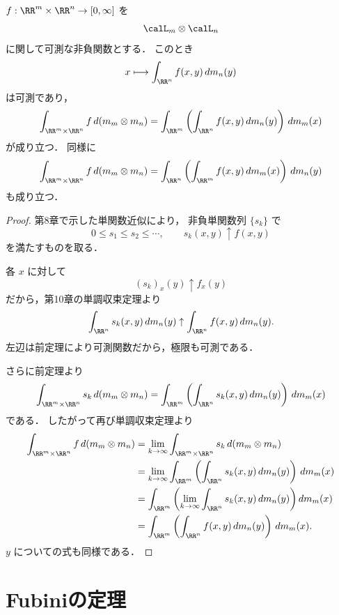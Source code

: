 \begin{theorem}[Tonelliの定理]
$f:\RR^m\times\RR^n\to[0,\infty]$ を
\[
\calL_m\otimes\calL_n
\]
に関して可測な非負関数とする．
このとき
\[
x\longmapsto \int_{\RR^n}f(x,y)\,dm_n(y)
\]
は可測であり，
\[
\int_{\RR^m\times\RR^n}f\,d(m_m\otimes m_n)
=
\int_{\RR^m}\left(\int_{\RR^n}f(x,y)\,dm_n(y)\right)\,dm_m(x)
\]
が成り立つ．
同様に
\[
\int_{\RR^m\times\RR^n}f\,d(m_m\otimes m_n)
=
\int_{\RR^n}\left(\int_{\RR^m}f(x,y)\,dm_m(x)\right)\,dm_n(y)
\]
も成り立つ．
\end{theorem}
\begin{proof}
第8章で示した単関数近似により，
非負単関数列 $\{s_k\}$ で
\[
0\le s_1\le s_2\le\cdots,\qquad s_k(x,y)\uparrow f(x,y)
\]
を満たすものを取る．

各 $x$ に対して
\[
(s_k)_x(y)\uparrow f_x(y)
\]
だから，第10章の単調収束定理より
\[
\int_{\RR^n}s_k(x,y)\,dm_n(y)
\uparrow
\int_{\RR^n}f(x,y)\,dm_n(y).
\]
左辺は前定理により可測関数だから，極限も可測である．

さらに前定理より
\[
\int_{\RR^m\times\RR^n}s_k\,d(m_m\otimes m_n)
=
\int_{\RR^m}\left(\int_{\RR^n}s_k(x,y)\,dm_n(y)\right)\,dm_m(x)
\]
である．
したがって再び単調収束定理より
\begin{align*}
\int_{\RR^m\times\RR^n}f\,d(m_m\otimes m_n)
&=
\lim_{k\to\infty}\int_{\RR^m\times\RR^n}s_k\,d(m_m\otimes m_n) \\
&=
\lim_{k\to\infty}
\int_{\RR^m}\left(\int_{\RR^n}s_k(x,y)\,dm_n(y)\right)\,dm_m(x) \\
&=
\int_{\RR^m}
\left(
\lim_{k\to\infty}\int_{\RR^n}s_k(x,y)\,dm_n(y)
\right)
dm_m(x) \\
&=
\int_{\RR^m}\left(\int_{\RR^n}f(x,y)\,dm_n(y)\right)\,dm_m(x).
\end{align*}
$y$ についての式も同様である．
\end{proof}

\section{Fubiniの定理}

